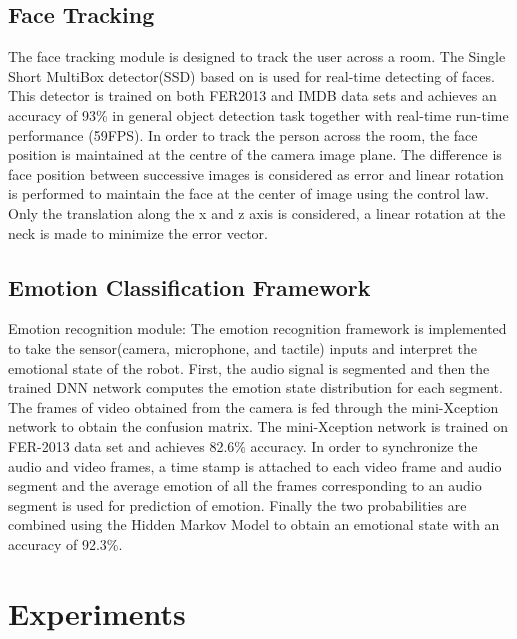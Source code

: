 \documentclass[letterpaper, 10 pt, conference]{ieeeconf}  %
\begin{document}
\subsection{Face Tracking}
The face tracking module is designed to track the user across a room. The Single Short MultiBox detector(SSD) based on \cite{} is used for real-time detecting of faces. This detector is trained on both FER2013 \cite{} and IMDB \cite{} data sets and achieves an accuracy of 93\% in general object detection task together with real-time run-time performance (59FPS). In order to track the person across the room, the face position is maintained at the centre of the camera image plane. The difference is face position between successive images is considered as error and linear rotation is performed to maintain the face at the center of image using the control law.  Only the translation along the x and z axis is considered, a linear rotation at the neck is made to minimize the error vector.

\subsection{Emotion Classification Framework}

Emotion recognition module: 
The emotion recognition framework is implemented to take the sensor(camera, microphone, and tactile) inputs and interpret the emotional state of the robot. First, the audio signal is segmented and then the trained DNN network computes the emotion state distribution for each segment. The frames of video obtained from the camera is fed through the mini-Xception network to obtain the confusion matrix. The mini-Xception network is trained on FER-2013 data set and achieves 82.6\% accuracy. In order to synchronize the audio and video frames, a time stamp is attached to each video frame and audio segment and the average emotion of all the frames corresponding to an audio segment is used for prediction of emotion. Finally the two probabilities are combined using the Hidden Markov Model to obtain an emotional state with an accuracy of 92.3\%. 
\section{Experiments}
\end{document}
